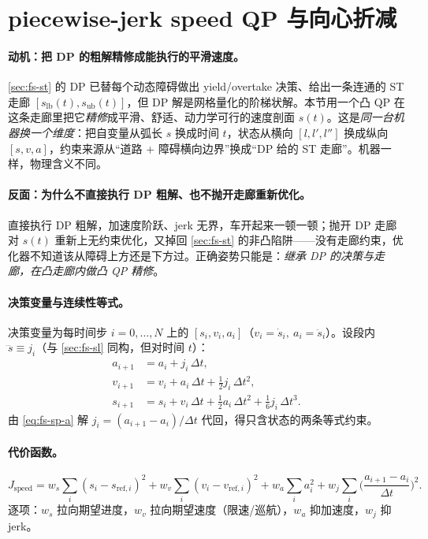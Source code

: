 \section{piecewise-jerk speed QP 与向心折减}
\label{sec:fs-speedqp}

\paragraph{动机：把 DP 的粗解精修成能执行的平滑速度。}
\cref{sec:fs-st} 的 DP 已替每个动态障碍做出 yield/overtake 决策、给出一条连通的 ST 走廊 $[s_{\mathrm{lb}}(t),s_{\mathrm{ub}}(t)]$，但 DP 解是网格量化的阶梯状解。本节用一个凸 QP 在这条走廊里把它\emph{精修}成平滑、舒适、动力学可行的速度剖面 $s(t)$。这是\emph{同一台机器换一个维度}：把自变量从弧长 $s$ 换成时间 $t$，状态从横向 $[l,l',l'']$ 换成纵向 $[s,v,a]$，约束来源从“道路 + 障碍横向边界”换成“DP 给的 ST 走廊”。机器一样，物理含义不同。

\paragraph{反面：为什么不直接执行 DP 粗解、也不抛开走廊重新优化。}
直接执行 DP 粗解，加速度阶跃、jerk 无界，车开起来一顿一顿；抛开 DP 走廊对 $s(t)$ 重新上无约束优化，又掉回 \cref{sec:fs-st} 的非凸陷阱——没有走廊约束，优化器不知道该从障碍上方还是下方过。正确姿势只能是：\emph{继承 DP 的决策与走廊，在凸走廊内做凸 QP 精修}。

\paragraph{决策变量与连续性等式。}
决策变量为每时间步 $i=0,\dots,N$ 上的 $[s_i,v_i,a_i]$（$v_i=\dot s_i,\ a_i=\ddot s_i$）。设段内 $\dddot s\equiv j_i$（与 \cref{sec:fs-sl} 同构，但对时间 $t$）：
\begin{align}
  a_{i+1} &= a_i+j_i\,\Delta t, \label{eq:fs-sp-a}\\
  v_{i+1} &= v_i+a_i\,\Delta t+\tfrac12 j_i\,\Delta t^2, \label{eq:fs-sp-v}\\
  s_{i+1} &= s_i+v_i\,\Delta t+\tfrac12 a_i\,\Delta t^2+\tfrac16 j_i\,\Delta t^3. \label{eq:fs-sp-s}
\end{align}
由 \cref{eq:fs-sp-a} 解 $j_i=(a_{i+1}-a_i)/\Delta t$ 代回，得只含状态的两条等式约束。

\paragraph{代价函数。}
\begin{equation}
  J_{\mathrm{speed}}=w_s\sum_i(s_i-s_{\mathrm{ref},i})^2+w_v\sum_i(v_i-v_{\mathrm{ref},i})^2+w_a\sum_i a_i^2+w_j\sum_i\Big(\frac{a_{i+1}-a_i}{\Delta t}\Big)^2.
  \label{eq:fs-speed-cost}
\end{equation}
逐项：$w_s$ 拉向期望进度，$w_v$ 拉向期望速度（限速/巡航），$w_a$ 抑加速度，$w_j$ 抑 jerk。

